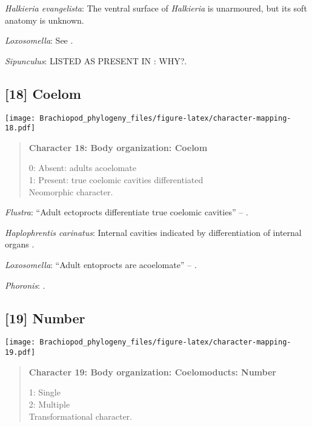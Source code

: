 \documentclass[openany]{book}
\theoremstyle{definition}
\theoremstyle{definition}
\theoremstyle{definition}
\theoremstyle{remark}
\begin{document}
\hypertarget{Halkieria_evangelista-coding-17}{}
\emph{Halkieria evangelista}: The ventral surface of \emph{Halkieria} is
unarmoured, but its soft anatomy is unknown.

\hypertarget{Loxosomella-coding-17}{}
\emph{Loxosomella}: See \citet{Haszprunar2008}.

\hypertarget{Sipunculus-coding-17}{}
\emph{Sipunculus}: LISTED AS PRESENT IN \citet{Smith2012}: WHY?.

\subsection*{{[}18{]} Coelom}\label{coelom}

\texttt{[image: Brachiopod\_phylogeny\_files/figure-latex/character-mapping-18.pdf]}

\begin{quote}
\textbf{Character 18: Body organization: Coelom}

0: Absent: adults acoelomate\\
1: Present: true coelomic cavities differentiated\\
Neomorphic character.
\end{quote}

\hypertarget{Flustra-coding-18}{}
\emph{Flustra}: ``Adult ectoprocts differentiate true coelomic
cavities'' -- \citet{Fuchs2008}.

\hypertarget{Haplophrentis_carinatus-coding-18}{}
\emph{Haplophrentis carinatus}: Internal cavities indicated by
differentiation of internal organs
\citep[see][]{Moysiuk2017Hyolithsare}.

\hypertarget{Loxosomella-coding-18}{}
\emph{Loxosomella}: ``Adult entoprocts are acoelomate'' --
\citet{Fuchs2008}.

\hypertarget{Phoronis-coding-18}{}
\emph{Phoronis}: \citet{Temereva2017Innervationof}.

\subsection*{{[}19{]} Number}\label{number-1}

\texttt{[image: Brachiopod\_phylogeny\_files/figure-latex/character-mapping-19.pdf]}

\begin{quote}
\textbf{Character 19: Body organization: Coelomoducts: Number}

1: Single\\
2: Multiple\\
Transformational character.
\end{quote}
\end{document}
